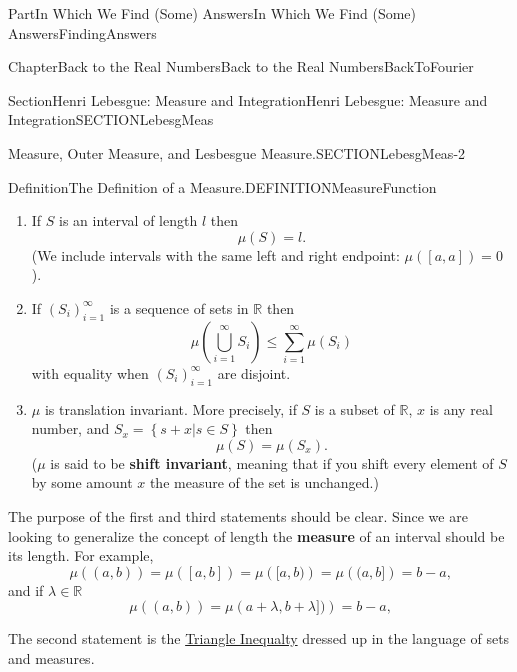 \documentclass[oneside,10pt,]{book}
\newcommand{\terminology}[1]{\textbf{#1}}
\numberwithin{equation}{part}
\newcommand{\RR}{\mathbb {R}}
\begin{document}
\begin{partptx}{Part}{In Which We Find (Some) Answers}{}{In Which We Find (Some) Answers}{}{}{FindingAnswers}
\begin{chapterptx}{Chapter}{Back to the Real Numbers}{}{Back to the Real Numbers}{}{}{BackToFourier}
\begin{sectionptx}{Section}{Henri Lebesgue: Measure and Integration}{}{Henri Lebesgue: Measure and Integration}{}{}{SECTIONLebesgMeas}
\begin{paragraphs}{Measure, Outer Measure, and  Lesbesgue Measure.}{SECTIONLebesgMeas-2}
\begin{definition}{Definition}{The Definition of a Measure.}{DEFINITIONMeasureFunction}
\begin{enumerate}[label={(\arabic*)}]
\item{}If \(S\) is an interval of length \(l\) then%
\begin{equation*}
\mu (S)=l\text{.}
\end{equation*}
(We include intervals with the same left and right endpoint: \(\mu ([a,a])=0\)).%
\item{}If \(\left( S_i\right)_{i=1}^\infty  \) is a sequence of  sets in \(\RR \) then%
\begin{equation*}
\mu\left( \bigcup_{i=1}^\infty S_i\right)\leq \sum_{i=1}^\infty
\mu\left(S_i\right)
\end{equation*}
with equality when \(\left( S_i\right)_{i=1}^\infty  \) are disjoint.%
\item{}\(\mu{}\) is translation invariant. More precisely, if \(S \) is a subset of \(\RR \), \(x\) is any real number, and \(S_x=\left\{s+x\left| s\in S
\right.\right\}  \) then%
\begin{equation*}
\mu (S)=\mu(S_x). 
\end{equation*}
(\(\mu{}\) is said to be \terminology{shift invariant}, meaning that if you shift every element of \(S\) by some amount \(x\) the measure of the set is unchanged.)%
\end{enumerate}
%
\end{definition}
The purpose of the first and third statements should be clear.  Since we are looking to generalize the concept of length the \terminology{measure} of an interval should be its length. For example,%
\begin{equation*}
\mu
\left( (a,b)\right) = \mu \left( [a,b]\right) =  \mu \left(
[a,b)\right) =\mu \left( (a,b]\right) =b-a\text{,}
\end{equation*}
and if \(\lambda{}\in\RR{}\)%
\begin{equation*}
\mu
\left( (a,b)\right) = \mu \left( a+\lambda{},b+\lambda{}])\right) = b-a\text{,}
\end{equation*}
%
\par
The second statement is the \hyperlink{TriangleIneq}{Triangle Inequalty} dressed up in the language of sets and measures.%
\par

\end{paragraphs}
\end{sectionptx}
\end{chapterptx}
\end{partptx}
\end{document}
